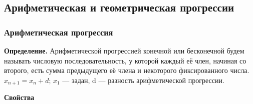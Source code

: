 \documentclass{article}
\begin{document}
    \subsection{Арифметическая и геометрическая прогрессии}
    
    \subsubsection{Арифметическая прогрессия}
    
    \textbf{Определение.} Арифметической прогрессией конечной или бесконечной будем называть числовую последовательность, у которой каждый её член, начиная со второго, есть сумма предыдущего её члена и некоторого фиксированного числа.
    \\ \(x_{n+1} = x_n + d\); \(x_1\) --- задан, d --- разность арифметической прогрессии.
    
    \textbf{Свойства}
    
\end{document}
